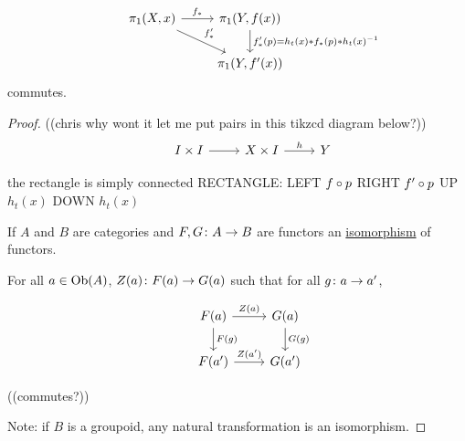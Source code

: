 \documentclass[11pt,leqno,oneside]{amsart}
\numberwithin{thm}{section}
\newcommand{\fund}{\pi_1}
\newcommand{\x}{\times}
\newcommand{\id}{\text{id}}
\begin{document}
\begin{thm}
  $$\begin{tikzcd}
    &\fund(X,x) \arrow[r, "f_*"] \arrow[rd, "f'_*"] &\fund(Y,f(x)) \arrow[d, "f_*'(p) = h_t(x) * f_*(p) * h_t(x)^{-1}"] \\
    & &\fund(Y, f'(x))
  \end{tikzcd}$$
  commutes.
\end{thm}
\begin{proof}
  ((chris why wont it let me put pairs in this tikzcd diagram below?))
  $$\begin{tikzcd}
    &I \x I \arrow[r, ""] &X \x I \arrow[r, "h"] &Y
  \end{tikzcd}$$

  the rectangle is simply connected
  RECTANGLE:
  LEFT
  $f \circ p$
  RIGHT
  $f' \circ p$
  UP
  $h_t(x)$
  DOWN
  $h_t(x)$

  If $A$ and $B$ are categories and $F,G\colon A \to B$ are functors an \underline{isomorphism} of functors.

  For all $a \in \text{Ob}(A)$, $Z(a)\colon F(a) \to G(a)$ such that for all $g \colon a \to a'$,

  $$\begin{tikzcd}
    &F(a) \arrow[r, "Z(a)"] \arrow[d, "F(g)"] & G(a) \arrow[d, "G(g)"] \\
    &F(a') \arrow[r, "Z(a')"]                  & G(a')
  \end{tikzcd}$$

  ((commutes?))

  Note: if $B$ is a groupoid, any natural transformation is an isomorphism.
\end{proof}
\end{document}
